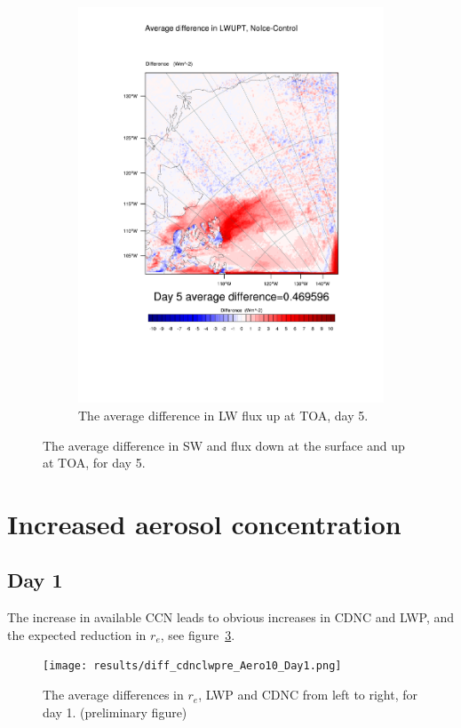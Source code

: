 \begin{figure}
\begin{subfigure}{0.48\textwidth}
		\includegraphics[width=\textwidth]{results/noice/diff_NoIce_LWUPT_Day5.pdf}
		\caption{The average difference in LW flux up at TOA, day 5.}
		\label{subfig:lwup_r2Day5}
	\end{subfigure}
	\caption{The average difference in SW and flux down at the surface and up at TOA, for day 5.}
	\label{fig:radiation_r2Day5}
\end{figure}
\section{Increased aerosol concentration}
\subsection{Day 1}
The increase in available CCN leads to obvious increases in CDNC and LWP, and the expected reduction in $r_e$, see figure~\ref{fig:cdnclwpre_Aero10}.%
\begin{figure}[h!]
\centering
\texttt{[image: results/diff\_cdnclwpre\_Aero10\_Day1.png]}
\caption{The average differences in $r_e$, LWP and CDNC from left to right, for day 1. (preliminary figure)}
\label{fig:cdnclwpre_Aero10}
\end{figure}

